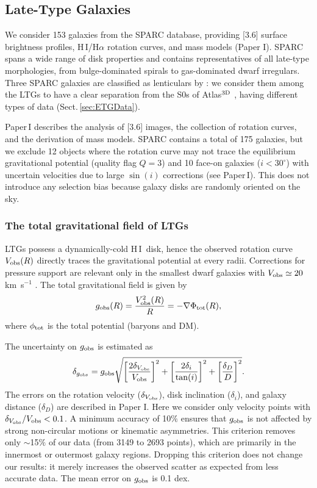 \documentclass[apjl, twocolappendix]{emulateapj}
\newcommand{\hi } {{\rm H}\,{\small\rm I} \,}
\newcommand{\hiA} {{\rm H}\,{\small\rm I}}
\begin{document}
\subsection{Late-Type Galaxies}\label{sec:DiskData}

We consider 153 galaxies from the SPARC database, providing [3.6] surface brightness profiles, \hiA/H$\alpha$ rotation curves, and mass models (Paper I). SPARC spans a wide range of disk properties and contains representatives of all late-type morphologies, from bulge-dominated spirals to gas-dominated dwarf irregulars. Three SPARC galaxies are classified as lenticulars by \citet{RC3}: we consider them among the LTGs to have a clear separation from the S0s of Atlas$^{\rm 3D}$ \citep{Cappellari2011}, having different types of data (Sect.\,\ref{sec:ETGData}).

Paper\,I describes the analysis of [3.6] images, the collection of rotation curves, and the derivation of mass models. SPARC contains a total of 175 galaxies, but we exclude 12 objects where the rotation curve may not trace the equilibrium gravitational potential (quality flag $Q=3$) and 10 face-on galaxies ($i < 30^{\circ}$) with uncertain velocities due to large $\sin(i)$ corrections (see Paper\,I). This does not introduce any selection bias because galaxy disks are randomly oriented on the sky.

\subsubsection{The total gravitational field of LTGs}

LTGs possess a dynamically-cold \hi disk, hence the observed rotation curve $V_{\rm obs}(R)$ directly traces the gravitational potential at every radii. Corrections for pressure support are relevant only in the smallest dwarf galaxies with $V_{\rm obs}\simeq 20$ km~s$^{-1}$ \citep[e.g.,][]{Lelli2012b}. The total gravitational field is given by
\begin{equation}
 g_{\rm obs}(R) = \dfrac{V_{\rm obs}^{2}(R)}{R} = -\nabla \Phi_{\rm tot}(R),
\end{equation}
where $\phi_{\rm tot}$ is the total potential (baryons and DM). 

The uncertainty on $g_{\rm obs}$ is estimated as
\begin{equation}
 \delta_{g_{\rm obs}} = g_{\rm obs} 
 \sqrt{\bigg[\dfrac{2\delta_{V_{\rm obs}}}{V_{\rm obs}}\bigg]^{2} 
 + \bigg[\dfrac{2\delta_{i}}{\tan(i)}\bigg]^{2} 
 + \bigg[\dfrac{\delta_{D}}{D}\bigg]^{2}}.
\end{equation}
The errors on the rotation velocity ($\delta_{V_{\rm obs}}$), disk inclination ($\delta_{i}$), and galaxy distance ($\delta_{D}$) are described in Paper I. Here we consider only velocity points with $\delta_{V_{\rm obs}}/V_{\rm obs} < 0.1$. A minimum accuracy of 10$\%$ ensures that $g_{\rm obs}$ is not affected by strong non-circular motions or kinematic asymmetries. This criterion removes only $\sim$15$\%$ of our data (from 3149 to 2693 points), which are primarily in the innermost or outermost galaxy regions. Dropping this criterion does not change our results: it merely increases the observed scatter as expected from less accurate data. The mean error on $g_{\rm obs}$ is 0.1 dex.
\end{document}
